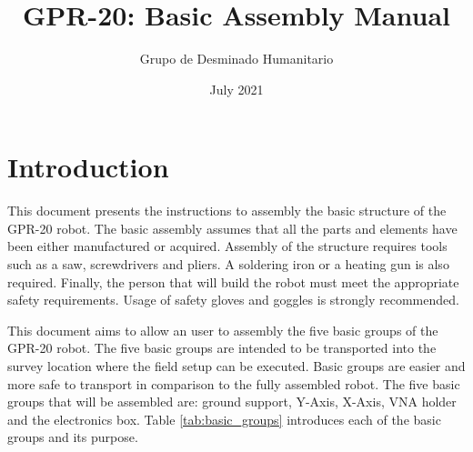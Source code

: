 \documentclass{article}
\title{GPR-20: Basic Assembly Manual}
\author{Grupo de Desminado Humanitario}
\date{July 2021}
\begin{document}


\newpage
\section{Introduction}
This document presents the instructions to assembly the basic structure of the GPR-20 robot. The basic assembly assumes that all the parts and elements have been either manufactured or acquired. Assembly of the structure requires tools such as a saw, screwdrivers and pliers. A soldering iron or a heating gun is also required. Finally, the person that will build the robot must meet the appropriate safety requirements. Usage of safety gloves and goggles is strongly recommended. 

This document aims to allow an user to assembly the five basic groups of the GPR-20 robot. The five basic groups are intended to be transported into the survey location where the field setup can be executed. Basic groups are easier and more safe to transport in comparison to the fully assembled robot. The five basic groups that will be assembled are: ground support, Y-Axis, X-Axis, VNA holder and the electronics box. Table \ref{tab:basic_groups} introduces each of the basic groups and its purpose.
\end{document}
